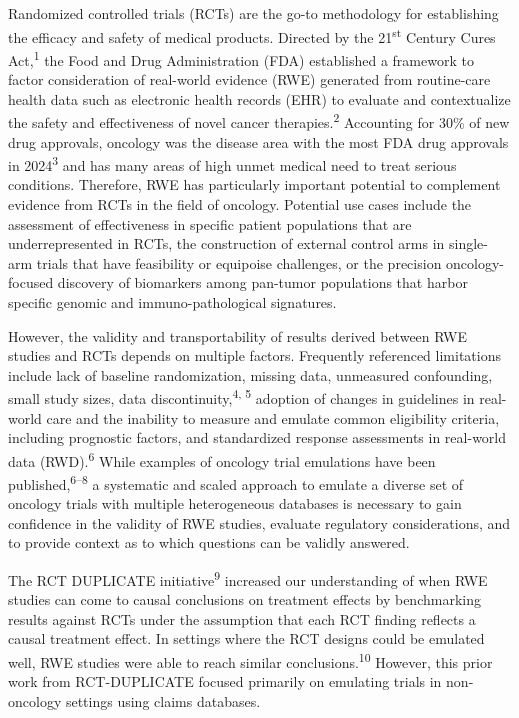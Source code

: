 \documentclass[
  letterpaper,
  DIV=11,
  numbers=noendperiod]{scrartcl}
\begin{document}
Randomized controlled trials (RCTs) are the go-to methodology for
establishing the efficacy and safety of medical products. Directed by
the 21\textsuperscript{st} Century Cures Act,\textsuperscript{1} the
Food and Drug Administration (FDA) established a framework to factor
consideration of real-world evidence (RWE) generated from routine-care
health data such as electronic health records (EHR) to evaluate and
contextualize the safety and effectiveness of novel cancer
therapies.\textsuperscript{2} Accounting for 30\% of new drug approvals,
oncology was the disease area with the most FDA drug approvals in
2024\textsuperscript{3} and has many areas of high unmet medical need to
treat serious conditions. Therefore, RWE has particularly important
potential to complement evidence from RCTs in the field of oncology.
Potential use cases include the assessment of effectiveness in specific
patient populations that are underrepresented in RCTs, the construction
of external control arms in single-arm trials that have feasibility or
equipoise challenges, or the precision oncology-focused discovery of
biomarkers among pan-tumor populations that harbor specific genomic and
immuno-pathological signatures.

However, the validity and transportability of results derived between
RWE studies and RCTs depends on multiple factors. Frequently referenced
limitations include lack of baseline randomization, missing data,
unmeasured confounding, small study sizes, data
discontinuity,\textsuperscript{4, 5} adoption of changes in guidelines
in real-world care and the inability to measure and emulate common
eligibility criteria, including prognostic factors, and standardized
response assessments in real-world data (RWD).\textsuperscript{6} While
examples of oncology trial emulations have been
published,\textsuperscript{6--8} a systematic and scaled approach to
emulate a diverse set of oncology trials with multiple heterogeneous
databases is necessary to gain confidence in the validity of RWE
studies, evaluate regulatory considerations, and to provide context as
to which questions can be validly answered.

The RCT DUPLICATE initiative\textsuperscript{9} increased our
understanding of when RWE studies can come to causal conclusions on
treatment effects by benchmarking results against RCTs under the
assumption that each RCT finding reflects a causal treatment effect. In
settings where the RCT designs could be emulated well, RWE studies were
able to reach similar conclusions.\textsuperscript{10} However, this
prior work from RCT-DUPLICATE focused primarily on emulating trials in
non-oncology settings using claims databases.
\end{document}

